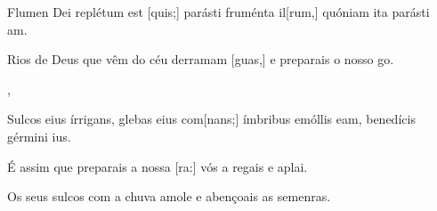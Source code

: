 {  {\item {}Flumen Dei replétum est [quis;] parásti fruménta il[rum,] quóniam ita parásti am.~\Responsorium}%
    {\item {}Rios de Deus que vêm do céu derramam [guas,] e preparais o nosso go.~\Responsorium},
  {\item {}Sulcos eius írrigans, glebas eius com[nans;] ímbribus emóllis eam, benedícis gérmini ius.~\Responsorium}%
    {\item {}É assim que preparais a nossa [ra:] vós a regais e aplai.~\Responsorium
      \item {}Os seus sulcos com a chuva amole e abençoais as semenras.~\Responsorium}
}